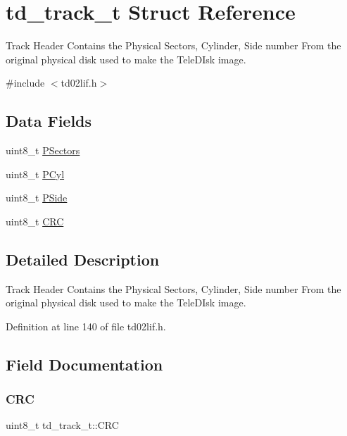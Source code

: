 \hypertarget{structtd__track__t}{}\section{td\+\_\+track\+\_\+t Struct Reference}
\label{structtd__track__t}


Track Header Contains the Physical Sectors, Cylinder, Side number From the original physical disk used to make the Tele\+D\+Isk image.  




{\ttfamily \#include $<$td02lif.\+h$>$}

\subsection*{Data Fields}
\begin{DoxyCompactItemize}
\item 
uint8\+\_\+t \hyperlink{structtd__track__t_a8f8ba7a0392f869f062f46d50a11bdfa}{P\+Sectors}
\item 
uint8\+\_\+t \hyperlink{structtd__track__t_a479a4bf60fcfdcbca513ebdea33b8e8c}{P\+Cyl}
\item 
uint8\+\_\+t \hyperlink{structtd__track__t_af2074402835d514cbf7f5f40e25fa284}{P\+Side}
\item 
uint8\+\_\+t \hyperlink{structtd__track__t_a32523d00c555ab3bc766a585d06ce372}{C\+RC}
\end{DoxyCompactItemize}


\subsection{Detailed Description}
Track Header Contains the Physical Sectors, Cylinder, Side number From the original physical disk used to make the Tele\+D\+Isk image. 

Definition at line 140 of file td02lif.\+h.



\subsection{Field Documentation}
\mbox{\label{structtd__track__t_a32523d00c555ab3bc766a585d06ce372}} 
\subsubsection{\texorpdfstring{C\+RC}{CRC}}
{\footnotesize\ttfamily uint8\+\_\+t td\+\_\+track\+\_\+t\+::\+C\+RC}




